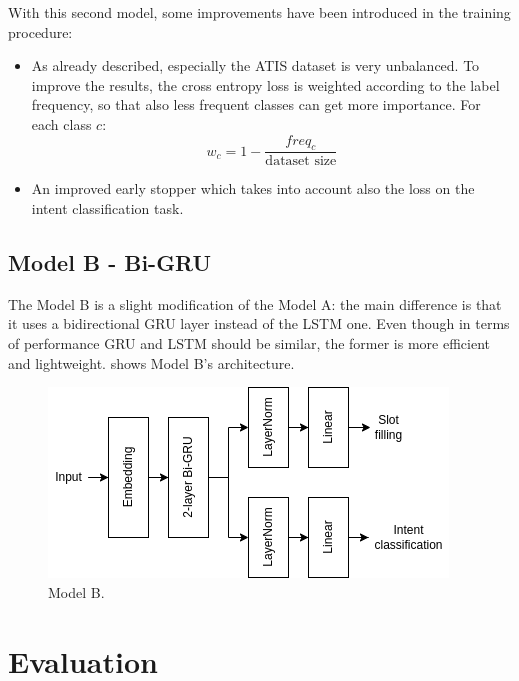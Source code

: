 \documentclass[a4paper]{article}
\begin{document}
With this second model, some improvements have been introduced in the training procedure:
\begin{itemize}
    \item As already described, especially the ATIS dataset is very unbalanced. To improve the results, the cross entropy loss is weighted according to the label frequency, so that also less frequent classes can get more importance. For each class $c$:
    \begin{equation*}
        w_c = 1 - \frac{freq_c}{\textrm{dataset size}}
    \end{equation*}
    \item An improved early stopper which takes into account also the loss on the intent classification task.
\end{itemize}

\subsection{Model B - Bi-GRU}
The Model B is a slight modification of the Model A: the main difference is that it uses a bidirectional GRU layer instead of the LSTM one. Even though in terms of performance GRU and LSTM should be similar, the former is more efficient and lightweight.  shows Model B's architecture.

\begin{figure}[!h]
    \centering
    \includegraphics[width=0.8\linewidth]{images/model-b.png}
    \caption{Model B.}
    \label{fig:model-b}
\end{figure}
 

\section{Evaluation}
\end{document}
